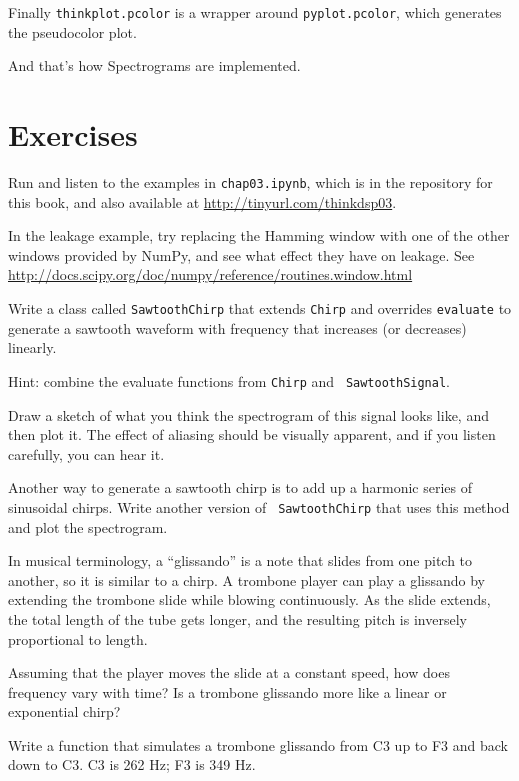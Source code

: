 \documentclass[12pt]{book}
\begin{document}
Finally {\tt thinkplot.pcolor} is a wrapper around {\tt pyplot.pcolor},
which generates the pseudocolor plot.

And that's how Spectrograms are implemented.


\section{Exercises}

\begin{exercise}
Run and listen to the examples in {\tt chap03.ipynb}, which is
in the repository for this book, and also available at
\url{http://tinyurl.com/thinkdsp03}.

In the leakage example, try replacing the Hamming window with one of
the other windows provided by NumPy, and see what effect they have on
leakage.  See
\url{http://docs.scipy.org/doc/numpy/reference/routines.window.html}
\end{exercise}

\begin{exercise}
Write a class called {\tt SawtoothChirp} that extends {\tt Chirp}
and overrides {\tt evaluate} to generate a sawtooth waveform with
frequency that increases (or decreases) linearly.

Hint: combine the evaluate functions from {\tt Chirp} and {\tt
  SawtoothSignal}.

Draw a sketch of what you think the spectrogram of this signal
looks like, and then plot it.  The effect of aliasing should be
visually apparent, and if you listen carefully, you can hear it.
\end{exercise}


\begin{exercise}
Another way to generate a sawtooth chirp is to add up a harmonic
series of sinusoidal chirps.  Write another version of {\tt
  SawtoothChirp} that uses this method and plot the spectrogram.
\end{exercise}

\begin{exercise}
In musical terminology, a ``glissando'' is a note that slides from one
pitch to another, so it is similar to a chirp.  A trombone player can
play a glissando by extending the trombone slide while blowing
continuously.  As the slide extends, the total length of the tube gets
longer, and the resulting pitch is inversely proportional to length.

Assuming that the player moves the slide at a constant speed, how
does frequency vary with time?  Is a trombone glissando more like
a linear or exponential chirp?

Write a function that simulates a trombone glissando from C3 up to F3
and back down to C3.  C3 is 262 Hz; F3 is 349 Hz.
\end{exercise}
\end{document}
